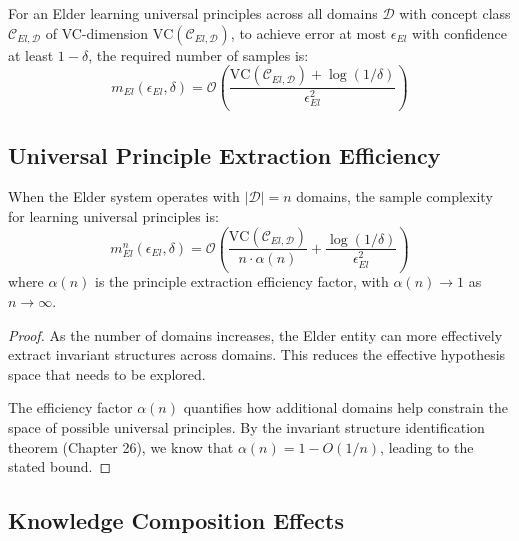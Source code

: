 \begin{theorem}
For an Elder learning universal principles across all domains $\mathcal{D}$ with concept class $\mathcal{C}_{El,\mathcal{D}}$ of VC-dimension $\text{VC}(\mathcal{C}_{El,\mathcal{D}})$, to achieve error at most $\epsilon_{El}$ with confidence at least $1-\delta$, the required number of samples is:
\begin{equation}
m_{El}(\epsilon_{El}, \delta) = \mathcal{O}\left(\frac{\text{VC}(\mathcal{C}_{El,\mathcal{D}}) + \log(1/\delta)}{\epsilon_{El}^2}\right)
\end{equation}
\end{theorem}

\subsection{Universal Principle Extraction Efficiency}

\begin{theorem}
When the Elder system operates with $|\mathcal{D}| = n$ domains, the sample complexity for learning universal principles is:
\begin{equation}
m_{El}^n(\epsilon_{El}, \delta) = \mathcal{O}\left(\frac{\text{VC}(\mathcal{C}_{El,\mathcal{D}})}{n \cdot \alpha(n)} + \frac{\log(1/\delta)}{\epsilon_{El}^2}\right)
\end{equation}
where $\alpha(n)$ is the principle extraction efficiency factor, with $\alpha(n) \rightarrow 1$ as $n \rightarrow \infty$.
\end{theorem}

\begin{proof}
As the number of domains increases, the Elder entity can more effectively extract invariant structures across domains. This reduces the effective hypothesis space that needs to be explored.

The efficiency factor $\alpha(n)$ quantifies how additional domains help constrain the space of possible universal principles. By the invariant structure identification theorem (Chapter 26), we know that $\alpha(n) = 1 - O(1/n)$, leading to the stated bound.
\end{proof}

\subsection{Knowledge Composition Effects}

